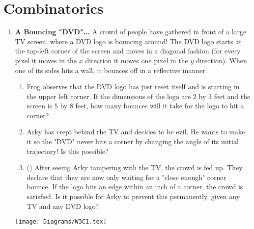 \documentclass[11pt]{scrartcl}
\begin{document}
\section{Combinatorics}
\begin{enumerate}[label=\textbf{C\arabic*}.]
    \item \textbf{A Bouncing "DVD"...} \newline
    A crowd of people have gathered in front of a large TV screen, where a DVD logo is bouncing around! The DVD logo starts at the top-left corner of the screen and moves in a diagonal fashion (for every pixel it moves in the $x$ direction it moves one pixel in the $y$ direction). When one of its sides hits a wall, it bounces off in a reflective manner.
    \begin{enumerate}
        \item Frog observes that the DVD logo has just reset itself and is starting in the upper left corner. If the dimensions of the logo are $2$ by $3$ feet and the screen is $5$ by $8$ feet, how many bounces will it take for the logo to hit a corner?
        
        \item Arky has crept behind the TV and decides to be evil. He wants to make it so the "DVD" never hits a corner by changing the angle of its initial trajectory! Is this possible?
        
        \item (\fullchili \fullchili) After seeing Arky tampering with the TV, the crowd is fed up. They declare that they are now only waiting for a "close enough" corner bounce. If the logo hits an edge within an inch of a corner, the crowd is satisfied. Is it possible for Arky to prevent this permanently, given any TV and any DVD logo?
    \end{enumerate}
    \vspace{30pt}
    \begin{center}
        \texttt{[image: Diagrams/W3C1.tex]}
    \end{center}
\end{enumerate}

\newpage
\end{document}
